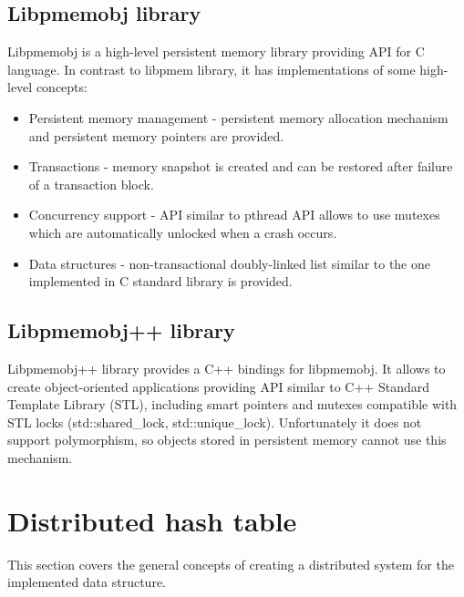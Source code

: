     \subsection{Libpmemobj library}
        Libpmemobj is a high-level persistent memory library providing API for C language.
        In contrast to libpmem library, it has implementations of some high-level concepts: 
        \begin{itemize}
            \item Persistent memory management - persistent memory allocation mechanism and persistent memory pointers are provided.
            \item Transactions - memory snapshot is created and can be restored after failure of a transaction block.
            \item Concurrency support - API similar to pthread API allows to use mutexes which are automatically unlocked when a crash occurs.
            \item Data structures - non-transactional doubly-linked list similar to the one implemented in C standard library is provided. 
        \end{itemize}
        
    \subsection{Libpmemobj++ library}
        Libpmemobj++ library provides a C++ bindings for libpmemobj.
        It allows to create object-oriented applications providing API similar to C++ Standard Template Library (STL), including smart pointers and mutexes compatible with STL locks (std::shared\_lock, std::unique\_lock). %
        Unfortunately it does not support polymorphism, so objects stored in persistent memory cannot use this mechanism.
    
\section{Distributed hash table} %

    This section covers the general concepts of creating a distributed system for the implemented data structure.

